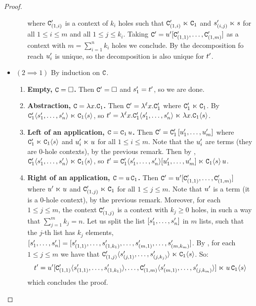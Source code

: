 \begin{proof}
\begin{itemize}
\begin{enumerate}
    where $\mathtt{C}'_{(1,i)}$ is a context of $k_i$ holes
    such that $\mathtt{C}'_{(1,i)} \mathrel{\ltimes} \mathtt{C}_1$ and $s'_{(i,j)} \mathrel{\ltimes} s$ for all $1 \leq i \leq m$ and all $1 \leq j \leq k_i$.
    Taking $\mathtt{C}' = u'[\mathtt{C}'_{(1,1)},\hdots,\mathtt{C}'_{(1,m)}]$ as a context with $m = \sum_{i=1}^{n} k_i$ holes
    we conclude.
    By \ih the decomposition fo reach $u'_i$ is unique,
    so the decomposition is also unique for $t'$.
  \end{enumerate}
\item $(2 \implies 1)$
  By induction on $\mathtt{C}$.
  \begin{enumerate}
  \item {\bf Empty, $\mathtt{C} = \Box$.}
    Then $\mathtt{C}' = \Box$ and $s'_1 = t'$, so we are done.
  \item {\bf Abstraction, $\mathtt{C} = \lambda x. \mathtt{C}_1$.}
    Then $\mathtt{C}' = \lambda^{\ell} x. \mathtt{C}'_1$ where $\mathtt{C}'_1 \mathrel{\ltimes} \mathtt{C}_1$.
    By \ih $\mathtt{C}'_1\langle s'_1,\hdots,s'_n\rangle \mathrel{\ltimes} \mathtt{C}_1\langle s\rangle$,
    so $t' = \lambda^{\ell} x. \mathtt{C}'_1\langle s'_1,\hdots,s'_n\rangle \mathrel{\ltimes} \lambda x. \mathtt{C}_1\langle s\rangle$.
  \item {\bf Left of an application, $\mathtt{C} = \mathtt{C}_1\,u$.}
    Then $\mathtt{C}' = \mathtt{C}'_1\,[u'_1,\hdots,u'_m]$ where $\mathtt{C}'_1 \mathrel{\ltimes} \mathtt{C}_1\langle s\rangle$ and
    $u'_i \mathrel{\ltimes} u$ for all $1 \leq i \leq m$.
    Note that the $u'_i$ are terms (\ie they are $0$-hole contexts), by the previous remark.
    Then by \ih, $\mathtt{C}'_1\langle s'_1,\hdots,s'_n\rangle \mathrel{\ltimes} \mathtt{C}_1\langle s\rangle$,
    so $t' = \mathtt{C}'_1\langle s'_1,\hdots,s'_n\rangle[u'_1,\hdots,u'_m] \mathrel{\ltimes} \mathtt{C}_1\langle s\rangle\,u$.
  \item {\bf Right of an application, $\mathtt{C} = u\,\mathtt{C}_1$.}
    Then $\mathtt{C}' = u'[\mathtt{C}'_{(1,1)},\hdots,\mathtt{C}'_{(1,m)}]$
    where $u' \mathrel{\ltimes} u$ and $\mathtt{C}'_{(1,j)} \mathrel{\ltimes} \mathtt{C}_1$ for all $1 \leq j \leq m$.
    Note that $u'$ is a term (\ie it is a $0$-hole context), by the previous remark. 
    Moreover, for each $1 \leq j \leq m$, the context $\mathtt{C}'_{(1,j)}$ is a context with $k_j \geq 0$ holes,
    in such a way that $\sum_{j=1}^{m} k_j = n$.
    Let us split the list $[s'_1,\hdots,s'_n]$ in $m$ lists, such that the $j$-th list has $k_j$ elements,
    \ie $[s'_1,\hdots,s'_n] = [s'_{(1,1)},\hdots,s'_{(1,k_1)},\hdots,s'_{(m,1)},\hdots,s'_{(m,k_m)}]$.
    By \ih, for each $1 \leq j \leq m$ we have that $\mathtt{C}'_{(1,j)}\langle s'_{(j,1)},\hdots,s'_{(j,k_j)} \rangle \mathrel{\ltimes} \mathtt{C}_1\langle s\rangle$.
    So:
    \[
      t' = u'[\mathtt{C}'_{(1,1)}\langle s'_{(1,1)},\hdots,s'_{(1,k_1)} \rangle,\hdots,\mathtt{C}'_{(1,m)}\langle s'_{(m,1)},\hdots,s'_{(j,k_m)} \rangle]
      \mathrel{\ltimes} u\,\mathtt{C}_1\langle s\rangle
    \]
    which concludes the proof.
  \end{enumerate}
\end{itemize}
\end{proof}

